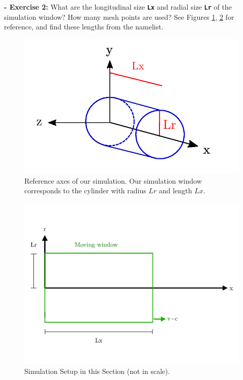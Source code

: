 \documentclass{article}
\newcommand{\commandline}[1]{\texttt{\textbf{#1}}}
\begin{document}
\textbf{ - Exercise 2:} What are the longitudinal size \commandline{Lx} and radial size \commandline{Lr} of the simulation window? How many mesh points are used? See Figures \ref{reference_axes}, \ref{Schema0} for reference,  and find these lengths from the namelist.

\begin{figure}[h!]
  \begin{center}
  \includegraphics[scale=1.]{Reference.pdf}
  \end{center}
  \caption{Reference axes of our simulation. Our simulation window corresponds to the cylinder with radius $Lr$ and length $Lx$. }
  \label{reference_axes}
\end{figure}

\begin{figure}[h!]
  \begin{center}
  \includegraphics[scale=0.3]{Schema_Simulation_0.pdf}
  \end{center}
  \caption{Simulation Setup in this Section (not in scale).}
  \label{Schema0}
\end{figure}
\end{document}
